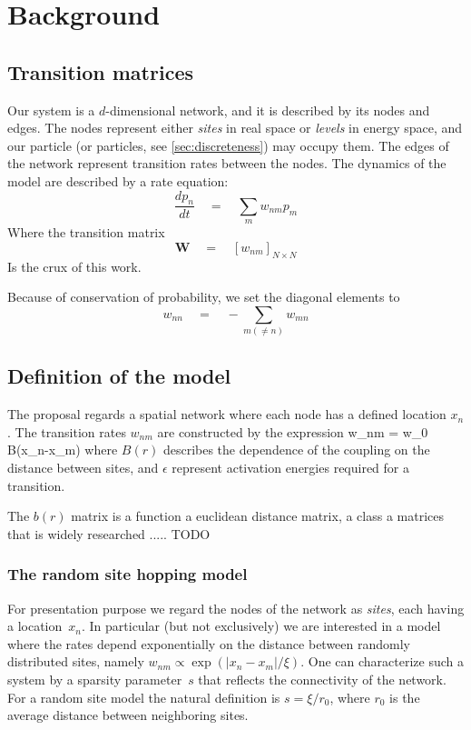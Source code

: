 \chapter{Background}

 



\section{Transition matrices}

Our system is a $d$-dimensional network, and it is
described by its nodes and edges. The nodes represent 
either {\em sites} in real space or {\em levels} in energy space, 
and our particle (or particles, see \ref{sec:discreteness}) may
occupy them. The edges of the network represent transition rates 
between the nodes. The dynamics of the model are described by 
a rate equation:
\[
\frac{dp_n}{dt} \quad = \quad \sum_m w_{nm}p_m
\]
Where the transition matrix 
\[
\mathbf{W} \quad =  \quad \left[ w_{nm}\right]_{N\times N}
\]
Is the crux of this work.

Because of conservation of probability, we set the diagonal
elements to
\[ w_{nn}\quad = \quad -\sum_{m(\ne n)} w_{mn}\]


\section{Definition of the model}


The proposal regards a spatial network where each node
has a defined location $x_n$. The transition rates $w_{nm}$
are constructed by the expression
%
\beq
w_{nm} \quad = \quad w_0 B(x_n-x_m)
\eeq
%
where $B(r)$ describes the dependence of the coupling on the
distance between sites, and $\epsilon$ represent activation
energies required for a transition.


The $b(r)$ matrix is a function a euclidean distance matrix,
a class a matrices that is widely researched ..... TODO

\subsection{The random site hopping model}




For presentation purpose we regard the nodes of the network as {\em sites}, 
each having a location~$x_n$. In particular (but not exclusively) we are interested 
in a model where the rates depend exponentially on the distance 
between randomly distributed sites, namely $w_{nm}\propto \exp(|x_n-x_m|/\xi)$. 
One can characterize such a system by a sparsity parameter~$s$ 
that reflects the connectivity of the network. For a random site model
the natural definition is $s=\xi/r_0$, where $r_0$ is the average distance 
between neighboring sites. 



